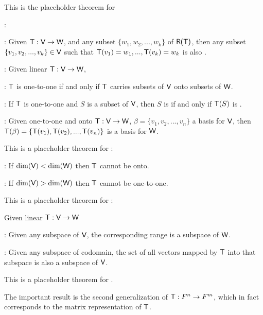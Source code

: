 \begin{additional theorem} \label{athm 2.2}
This is the placeholder theorem for

: 

: Given \(\textsf{T} : \textsf{V} \to \textsf{W}\), and any \LID{} subset \(\{ w_1, w_2, ..., w_k \}\) of \(\textsf{R(T)}\), then any subset \(\{ v_1, v_2, ..., v_k \} \in \textsf{V}\) such that \(\textsf{T}(v_1) = w_1, ..., \textsf{T}(v_k) = w_k\) is also \LID{}.

: Given linear \(\textsf{T} : \textsf{V} \to \textsf{W}\),

: \(\textsf{T}\) is one-to-one if and only if \(\textsf{T}\) carries \LID{} subsets of \(\textsf{V}\) onto \LID{} subsets of \(\textsf{W}\).

: If \(\textsf{T}\) is one-to-one and \(S\) is a subset of \(\textsf{V}\), then \(S\) is \LID{} if and only if \(\textsf{T}(S)\) is \LID{}.

: Given one-to-one and onto \(\textsf{T} : \textsf{V} \to \textsf{W}\), \(\beta = \{ v_1, v_2, ..., v_n \}\) a basis for \(\textsf{V}\), then\\
\(\textsf{T}(\beta) = \{ \textsf{T}(v_1), \textsf{T}(v_2), ..., \textsf{T}(v_n) \}\) is a basis for \(\textsf{W}\).
\end{additional theorem}

\begin{additional theorem} \label{athm 2.3}
This is a placeholder theorem for :

: If \(\dim(\textsf{V}) < \dim(\textsf{W})\) then \(\textsf{T}\) cannot be onto.

: If \(\dim(\textsf{V}) > \dim(\textsf{W})\) then \(\textsf{T}\) cannot be one-to-one.
\end{additional theorem}

\begin{additional theorem} \label{athm 2.4}
This is a placeholder theorem for :

Given linear \(\textsf{T} : \textsf{V} \to \textsf{W}\)

: Given any subspace of \(\textsf{V}\), the corresponding range is a subspace of \(\textsf{W}\).

: Given any subspace of codomain, the set of all vectors mapped by \(\textsf{T}\) into that subspace is also a subspace of \(\textsf{V}\).
\end{additional theorem}

\begin{additional theorem} \label{athm 2.5}
This is a placeholder theorem for .

The important result is the second generalization of \(\textsf{T} : F^n \to F^m\), which in fact corresponds to the matrix representation of \(\textsf{T}\).
\end{additional theorem}

